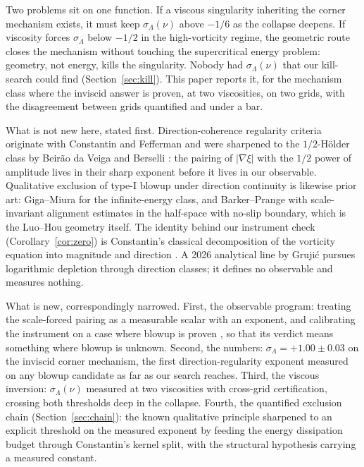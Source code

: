 \documentclass[11pt]{article}
\newcommand{\sL}{\sigma_{\!\Lambda}}
\begin{document}
Two problems sit on one function. If a viscous singularity inheriting the
corner mechanism exists, it must keep $\sL(\nu)$ above $-1/6$ as the
collapse deepens. If viscosity forces $\sL$ below $-1/2$ in the
high-vorticity regime, the geometric route closes the mechanism without
touching the supercritical energy problem: geometry, not energy, kills the
singularity. Nobody had $\sL(\nu)$ that our kill-search could find
(Section~\ref{sec:kill}). This paper reports it, for the
mechanism class where the inviscid answer is proven, at two viscosities,
on two grids, with the disagreement between grids quantified and under a
bar.

What is not new here, stated first. Direction-coherence regularity
criteria originate with Constantin and Fefferman \cite{CF93} and were
sharpened to the $1/2$-H\"older class by Beir\~ao da Veiga and Berselli
\cite{BdVB02,BdVB09}: the pairing of $|\nabla\xi|$ with the $1/2$ power of
amplitude lives in their sharp exponent before it lives in our observable.
Qualitative exclusion of type-I blowup under direction continuity is
likewise prior art: Giga--Miura \cite{GM11} for the infinite-energy class,
and Barker--Prange \cite{BP20} with scale-invariant alignment estimates in
the half-space with no-slip boundary, which is the Luo--Hou geometry
itself. The identity behind our instrument check
(Corollary~\ref{cor:zero}) is Constantin's classical decomposition of the
vorticity equation into magnitude and direction \cite{Con94}. A 2026
analytical line by Gruji\'c \cite{Gru26} pursues logarithmic depletion
through direction classes; it defines no observable and measures nothing.

What is new, correspondingly narrowed. First, the observable program:
treating the scale-forced pairing as a measurable scalar with an exponent,
and calibrating the instrument on a case where blowup is proven
\cite{CH22,CH25}, so that its verdict means something where blowup is
unknown. Second, the numbers: $\sL=+1.00\pm0.03$ on the inviscid corner
mechanism, the first direction-regularity exponent measured on any blowup
candidate as far as our search reaches. Third, the viscous inversion:
$\sL(\nu)$ measured at two viscosities with cross-grid certification,
crossing both thresholds deep in the collapse. Fourth, the quantified
exclusion chain (Section~\ref{sec:chain}): the known qualitative principle
\cite{GM11,BP20} sharpened to an explicit threshold on the measured
exponent by feeding the energy dissipation budget through Constantin's
kernel split, with the structural hypothesis carrying a measured constant.
\end{document}
